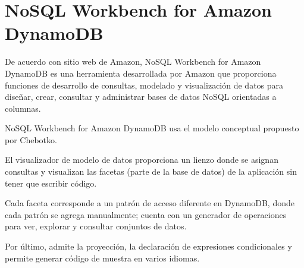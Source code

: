\section{NoSQL Workbench for Amazon DynamoDB}

De acuerdo con sitio web de Amazon\cite{amazon_nosql_2020}, NoSQL Workbench for Amazon DynamoDB es una herramienta desarrollada por Amazon que proporciona funciones de desarrollo de consultas, modelado y visualización de datos para diseñar, crear, consultar y administrar bases de datos NoSQL orientadas a columnas.


NoSQL Workbench for Amazon DynamoDB usa el modelo conceptual propuesto por Chebotko\cite{chebotko_big_2015}.


El visualizador de modelo de datos proporciona un lienzo donde se asignan consultas y visualizan las facetas (parte de la base de datos) de la aplicación sin tener que escribir código.


Cada faceta corresponde a un patrón de acceso diferente en DynamoDB, donde cada patrón se agrega manualmente; cuenta con un generador de operaciones para ver, explorar y consultar conjuntos de datos.


Por último, admite la proyección, la declaración de expresiones condicionales y permite generar código de muestra en varios idiomas.

